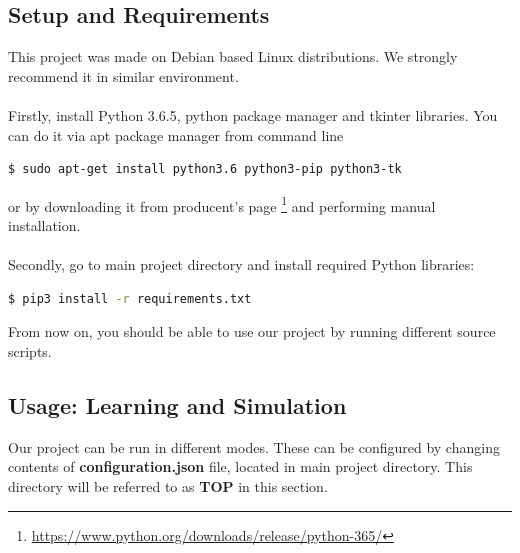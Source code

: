 \documentclass{article}
\begin{document}
\subsection{Setup and Requirements}
This project was made on Debian based Linux distributions. We strongly 
recommend it in similar environment. 
\\\\
Firstly, install Python 3.6.5, python package manager and tkinter libraries. You can do it via apt package manager from command line
\begin{lstlisting}[language=bash]
$ sudo apt-get install python3.6 python3-pip python3-tk
\end{lstlisting}
or by downloading it from producent's page
\footnote{\url{https://www.python.org/downloads/release/python-365/}}
 and performing manual installation.
\\ \\ 
Secondly, go to main project directory and install required Python libraries:
\begin{lstlisting}[language=bash]
$ pip3 install -r requirements.txt
\end{lstlisting}
From now on, you should be able to use our project by running different source scripts.

\subsection{Usage: Learning and Simulation}
Our project can be run in different modes. These can be configured by changing contents of 
\textbf{configuration.json} file, located in main project directory. This directory will be referred to as 
\textbf{TOP} in this section. 
\end{document}
